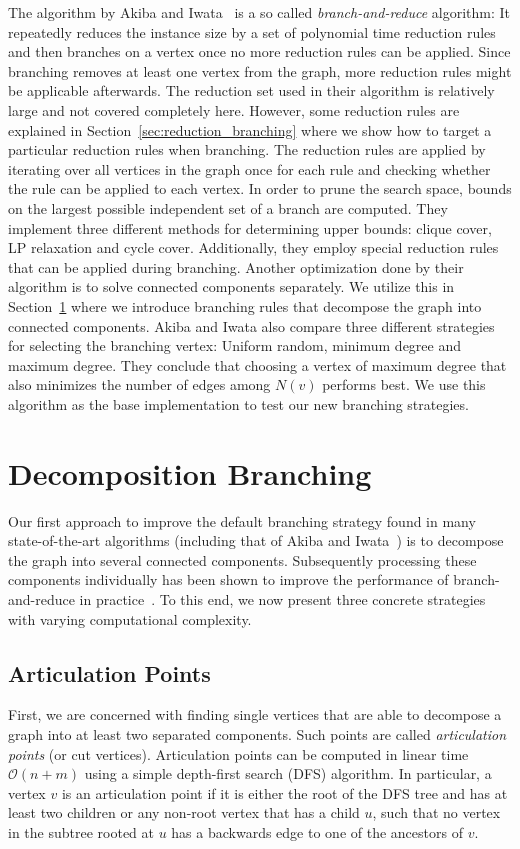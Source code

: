 \documentclass[a4paper,UKenglish,cleveref, autoref, thm-restate]{lipics-v2021}
\begin{document}
The algorithm by Akiba and Iwata~\cite{AkibaIwata} is a so called
\emph{branch-and-reduce} algorithm: It repeatedly reduces the instance size by a
set of polynomial time reduction rules and then branches on a vertex once no
more reduction rules can be applied. Since branching removes at least one vertex
from the graph, more reduction rules might be applicable afterwards. The
reduction set used in their algorithm is relatively large and not covered
completely here. However, some reduction rules are explained in
Section~\ref{sec:reduction_branching} where we show how to target a particular reduction
rules when branching. The reduction rules are applied by iterating over all
vertices in the graph once for each rule and checking whether the rule
can be applied to each vertex. In order to prune the search space, bounds on the largest
possible independent set of a branch are computed. They implement three different
methods for determining upper bounds: clique cover, LP relaxation and cycle
cover. Additionally, they employ special reduction rules that can be applied
during branching. Another optimization done by their algorithm is to solve
connected components separately. We utilize this in
Section~\ref{sec:decomposition_branching} where we introduce branching rules
that decompose the graph into connected components. Akiba and Iwata also
compare three different strategies for
selecting the branching vertex: Uniform random, minimum degree and maximum
degree. They conclude that choosing a vertex of maximum degree that also
minimizes the number of edges among $N(v)$ performs best. We use this algorithm
as the base implementation to test our new branching strategies.

\section{Decomposition Branching}
\label{sec:decomposition_branching}
Our first approach to improve the default branching strategy found in many state-of-the-art algorithms (including that of Akiba and Iwata~\cite{AkibaIwata}) is to decompose the graph into several connected components.
Subsequently processing these components individually has been shown to improve the performance of branch-and-reduce in practice~\cite{alsahafy2020computing}.
To this end, we now present three concrete strategies with varying computational complexity.

\subsection{Articulation Points}
First, we are concerned with finding single vertices that are able to decompose a graph into at least two separated components.
Such points are called \emph{articulation points} (or cut vertices).
Articulation points can be computed in linear time $\mathcal{O}(n+m)$ using a simple depth-first search (DFS) algorithm.
In particular, a vertex $v$ is an articulation point if it is either the root of
the DFS tree and has at least two children or any non-root vertex that has a child $u$, such that no vertex in
the subtree rooted at $u$ has a backwards edge to one of the ancestors of
$v$.
\end{document}
